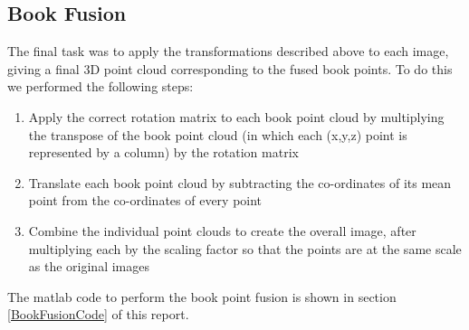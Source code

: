\subsection{Book Fusion}

The final task was to apply the transformations described above to each image, giving a final 3D point cloud corresponding to the fused book points. To do this we performed the following steps:

\begin{enumerate}
	\item Apply the correct rotation matrix to each book point cloud by multiplying the transpose of the book point cloud (in which each (x,y,z) point is represented by a column) by the rotation matrix
	\item Translate each book point cloud by subtracting the co-ordinates of its mean point from the co-ordinates of every point
	\item Combine the individual point clouds to create the overall image, after multiplying each by the scaling factor so that the points are at the same scale as the original images
\end{enumerate}

The matlab code to perform the book point fusion is shown in section \ref{BookFusionCode} of this report.





